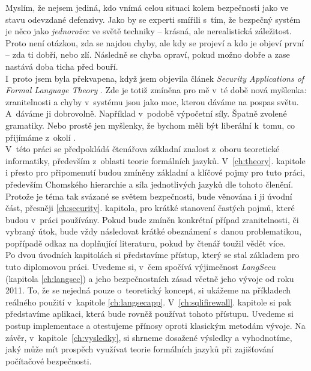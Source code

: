 Myslím, že nejsem jediná, kdo vnímá celou situaci kolem bezpečnosti jako ve stavu odevzdané defenzivy. Jako by se experti smířili s~tím, že bezpečný 
systém je něco jako \textit{jednorožec} ve světě techniky -- krásná, ale nerealistická záležitost. Proto není otázkou, zda se najdou chyby, ale kdy 
se projeví a kdo je objeví první -- zda ti dobří, nebo zlí. Následně se chyba opraví, pokud možno dobře a zase nastává doba ticha před bouří. \\

I~proto jsem byla překvapena, když jsem objevila článek \textit{Security Applications of Formal Language Theory} \cite{Sass2013}. Zde je totiž zmíněna 
pro mě v~té době nová myšlenka: zranitelnosti a chyby v~systému jsou jako moc, kterou dáváme na pospas světu. A~dáváme ji dobrovolně. Například v~podobě 
výpočetní síly. Špatně zvolené gramatiky. Nebo prostě jen myšlenky, že bychom měli být liberální k~tomu, co přijímáme z~okolí \cite[str. 1]{Geer2010}. \\

V~této práci se předpokládá čtenářova základní znalost z~oboru teoretické informatiky, především z~oblasti teorie formálních jazyků. V~\ref{ch:theory}. 
kapitole i přesto pro připomenutí budou zmíněny základní a klíčové pojmy pro tuto práci, především Chomského hierarchie a síla jednotlivých jazyků dle 
tohoto členění. Protože je téma tak svázané se světem bezpečnosti, bude věnována i ji úvodní část, přesněji \ref{ch:security}. kapitola, pro krátké 
stanovení častých pojmů, které budou v~práci používány. Pokud bude zmíněn konkrétní případ zranitelnosti, či vybraný útok, bude vždy následovat krátké 
obeznámení s~danou problematikou, popřípadě odkaz na doplňující literaturu, pokud by čtenář toužil vědět více. \\

Po dvou úvodních kapitolách si představíme přístup, který se stal základem pro tuto diplomovou práci. Uvedeme si, v~čem spočívá výjimečnost 
\textit{LangSecu} (kapitola \ref{ch:langsec}) a jeho bezpečnostních zásad včetně jeho vývoje od roku 2011. To, že se nejedná pouze o~teoretický koncept, 
si ukážeme na příkladech reálného použití v~kapitole \ref{ch:langsecapp}. V~\ref{ch:sqlifirewall}. kapitole si pak představíme aplikaci, která bude 
rovněž používat tohoto přístupu. Uvedeme si postup implementace a otestujeme přínosy oproti klasickým metodám vývoje. 
Na závěr, v~kapitole~\ref{ch:vysledky}, si shrneme dosažené výsledky a vyhodnotíme, jaký může mít prospěch využívat teorie formálních jazyků při 
zajišťování počítačové bezpečnosti. \\

